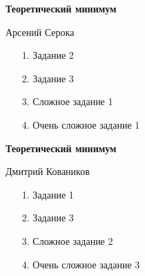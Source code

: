 \documentclass[11pt,a4paper]{article}
\begin{document}
\begin{center}
    \textbf{\Large{Теоретический минимум} \\}

    Арсений Серока
\end{center}

\begin{enumerate}
  \item[1.]
Задание 2
  \item[2.]
Задание 3
  \item[3.]
Сложное задание 1
  \item[4.]
Очень сложное задание 1
\end{enumerate}

\pagebreak

\begin{center}
    \textbf{\Large{Теоретический минимум} \\}

    Дмитрий Коваников
\end{center}

\begin{enumerate}
  \item[1.]
Задание 1
  \item[2.]
Задание 3
  \item[3.]
Сложное задание 2
  \item[4.]
Очень сложное задание 3
\end{enumerate}

\pagebreak
\end{document}
